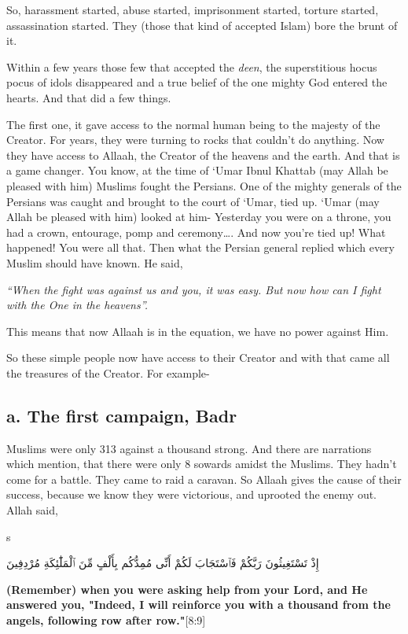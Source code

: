 {So, harassment started, abuse started, imprisonment started, torture started, assassination started. They (those that kind of accepted Islam) bore the brunt of it.

Within a few years those few that accepted the \textit{deen}, the superstitious hocus pocus of idols disappeared and a true belief of the one mighty God entered the hearts. And that did a few things.

The first one, it gave access to the normal human being to the majesty of the Creator. For years, they were turning to rocks that couldn’t do anything. Now they have access to Allaah, the Creator of the heavens and the earth. And that is a game changer. You know, at the time of ‘Umar Ibnul Khattab (may Allah be pleased with him) Muslims fought the Persians. One of the mighty generals of the Persians was caught and brought to the court of ‘Umar, tied up. ‘Umar (may Allah be pleased with him) looked at him- Yesterday you were on a throne, you had a crown, entourage, pomp and ceremony…. And now you’re tied up! What happened! You were all that. Then what the Persian general replied which every Muslim should have known. He said, 
\begin{center}
    \textit{“When the fight was against us and you, it was easy. But now how can I fight with the One in the heavens”.}
\end{center} 
This means that now Allaah is in the equation, we have no power against Him.

So these simple people now have access to their Creator and with that came all the treasures of the Creator. For example-

\subsection*{a. The first campaign, Badr}
Muslims were only 313 against a thousand strong. And there are narrations which mention, that there were only 8 sowards amidst the Muslims. They hadn’t come for a battle. They came to raid a caravan. So Allaah gives the cause of their success, because we know they were victorious, and uprooted the enemy out. Allah said, 
\begin{center}s
    \begin{RLtext}
        إِذْ تَسْتَغِيثُونَ رَبَّكُمْ فَٱسْتَجَابَ لَكُمْ أَنِّى مُمِدُّكُم بِأَلْفٍ مِّنَ ٱلْمَلَٰٓئِكَةِ مُرْدِفِينَ 
    \end{RLtext}
\end{center}
}
\textbf{(Remember) when you were asking help from your Lord, and He answered you, "Indeed, I will reinforce you with a thousand from the angels, following row after row."}[8:9]

